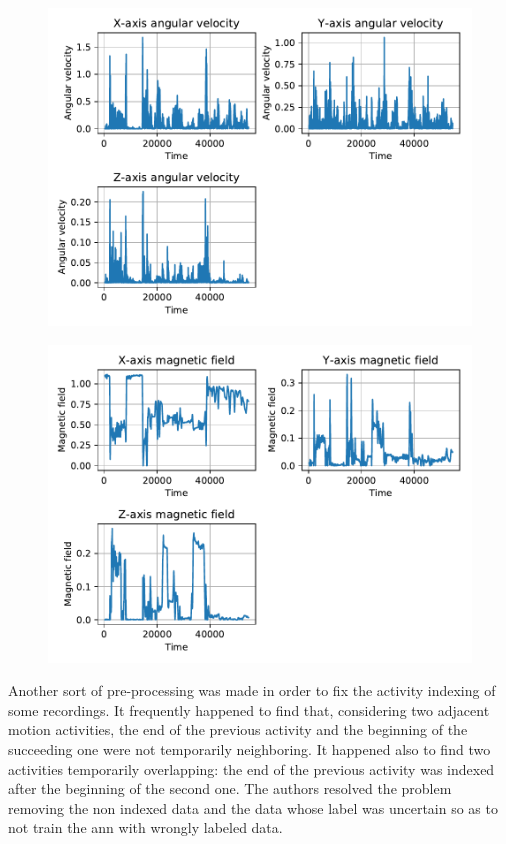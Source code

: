 \begin{figure}
\includegraphics[scale=0.55]{angular_velocity_susanna.pdf}
\caption{}
\label{fig:gyr}
\end{figure}

\begin{figure}
\includegraphics[scale=0.55]{magnetic_field_susanna.pdf}
\caption{}
\label{fig:mag}
\end{figure}


Another sort of pre-processing was made in order to fix the activity indexing of some recordings. It frequently happened to find that, considering two adjacent motion activities, the end of the previous activity and the beginning of the succeeding one were not temporarily neighboring. It happened also to find two activities temporarily overlapping: the end of the previous activity was indexed after the beginning of the second one. 
The authors resolved the problem removing the non indexed data and the data whose label was uncertain so as to not train the \gls{ann} with wrongly labeled data.

